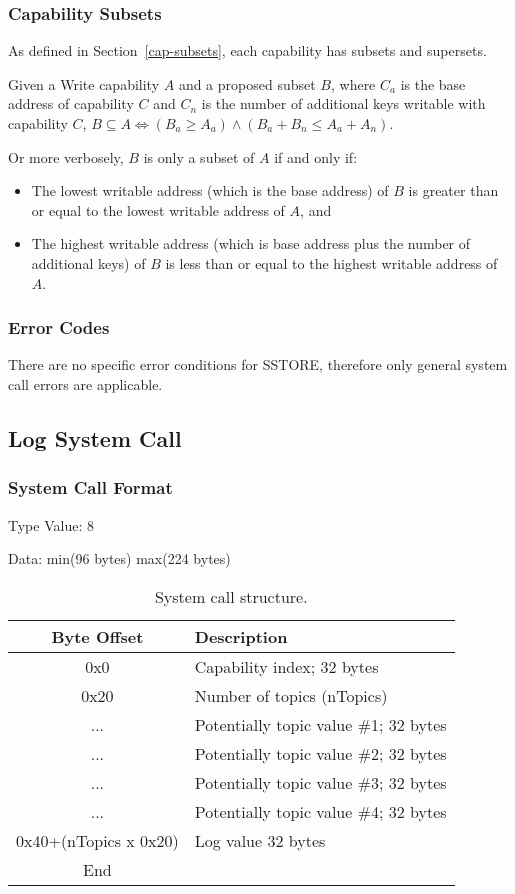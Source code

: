 \documentclass[english,a4paper]{article}
\let\oldparagraph\subsubsection
\renewcommand{\subsubsection}[1]{\oldparagraph{#1}\mbox{}}
\begin{document}
\subsubsection{Capability Subsets}
As defined in Section~\ref{cap-subsets}, each capability has subsets and
supersets.

Given a Write capability $A$ and a proposed subset $B$, where $C_a$ is the base
address of capability $C$ and $C_n$ is the number of additional keys writable
with capability $C$, $B \subseteq A \iff \left(B_a \geq A_a\right) \land
\left(B_a + B_n \leq A_a + A_n\right)$.

Or more verbosely, $B$ is only a subset of $A$ if and only if:
\begin{itemize}
  \item The lowest writable address (which is the base address) of $B$ is
  greater than or equal to the lowest writable address of $A$, and
  \item The highest writable address (which is base address plus the number of
  additional keys) of $B$ is less than or equal to the highest writable address
  of $A$.
\end{itemize}

\subsubsection{Error Codes}
There are no specific error conditions for SSTORE, therefore only general system
call errors are applicable.

\subsection{Log System Call}

\subsubsection{System Call Format}
Type Value: 8

Data: min(96 bytes) max(224 bytes)

\begin{table}[H]
  \caption{System call structure.}
  \centering{}%
  \begin{tabularx}{\textwidth}{c|X}
    \hline
    Byte Offset & Description \\
    \hline
    \hline
    0x0 & Capability index; 32 bytes \\
    0x20 & Number of topics (nTopics) \\
    ... & Potentially topic value \#1; 32 bytes \\
    ... & Potentially topic value \#2; 32 bytes \\
    ... & Potentially topic value \#3; 32 bytes \\
    ... & Potentially topic value \#4; 32 bytes \\
    0x40+(nTopics x 0x20) & Log value 32 bytes \\
    \hline
    End &  \\
    \hline
  \end{tabularx}
\end{table}
\end{document}
